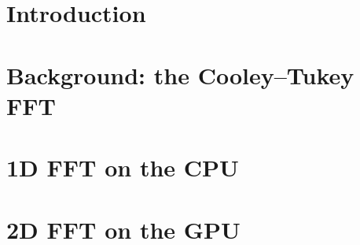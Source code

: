 \section{Introduction}
\section{Background: the Cooley--Tukey FFT}
\section{1D FFT on the CPU}
\section{2D FFT on the GPU}
